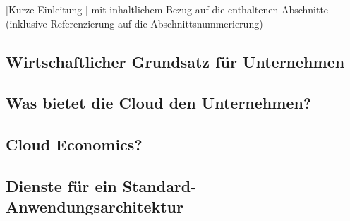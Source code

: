 [Kurze Einleitung ] mit inhaltlichem Bezug auf die enthaltenen Abschnitte (inklusive Referenzierung auf die Abschnittsnummerierung)

\subsection{Wirtschaftlicher Grundsatz für Unternehmen}\label{subsec_UabsGrund1}


\subsection{Was bietet die Cloud den Unternehmen?}\label{subsec_UabsGrund2}

\subsection{Cloud Economics?}\label{subsec_UabsGrund2}

\subsection{Dienste für ein Standard-Anwendungsarchitektur}\label{subsec_UabsGrund3}
